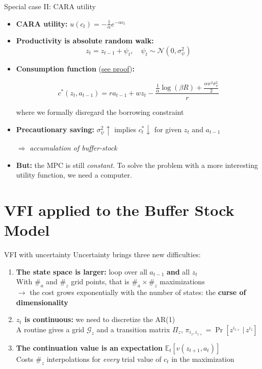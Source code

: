 \documentclass[
  10pt,
  ignorenonframetext,
  aspectratio=43,
  english,
]{beamer}
\providecommand{\tightlist}{%
  \setlength{\itemsep}{0pt}\setlength{\parskip}{0pt}}
\begin{document}
\begin{frame}{Special case II: CARA utility}
\protect{}\label{special-case-ii-cara-utility}
\begin{itemize}
\item
  \textbf{CARA utility:} \(u(c_{t})=-\frac{1}{\alpha}e^{-\alpha c_{t}}\)
\item
  \textbf{Productivity is absolute random walk:} \[
    z_{t}  =z_{t-1}+\psi_{t}, \quad \psi_{t}  \sim\mathcal{N}(0,\sigma^{2}_{\psi})
    \]
\item
  \textbf{Consumption function}
  (\href{https://www.econ2.jhu.edu/people/ccarroll/public/LectureNotes/Consumption/CARAModelWithYRisk/}{see
  proof})\textbf{:}

  \[
    c^{\ast}(z_{t},a_{t-1})=ra_{t-1}+wz_{t}-\frac{\frac{1}{\alpha}\log\left(\beta R\right)+\frac{\alpha w^{2}\sigma^{2}_{\psi}}{2}}{r}
    \]

  where we formally disregard the borrowing constraint
\item
  \textbf{Precautionary saving:} \(\sigma^{2}_{\psi}\uparrow\) implies
  \(c^{\ast}_{t}\downarrow\) for given \(z_{t}\) and \(a_{t-1}\)

  \(\Rightarrow\) \emph{accumulation of buffer-stock}
\item
  \textbf{But:} the MPC is still \emph{constant}. To solve the problem
  with a more interesting utility function, we need a computer.
\end{itemize}
\end{frame}

\section{VFI applied to the Buffer Stock
Model}\label{vfi-applied-to-the-buffer-stock-model}

\begin{frame}{VFI with uncertainty}
\protect{}\label{vfi-with-uncertainty}
Uncertainty brings three new difficulties:

\begin{enumerate}
\tightlist
\item
  \textbf{The state space is larger:} loop over all \(a_{t-1}\)
  \textbf{and} all \(z_t\) \pause\\
  With \(\#_{a}\) and \(\#_{z}\) grid points, that is
  \(\#_{a}\times \#_{z}\) maximizations\\
  \(\to\) the cost grows exponentially with the number of states: the
  \textbf{curse of dimensionality} \pause
\item
  \textbf{\(z_t\) is continuous:} we need to discretize the AR(1)
  \pause\\
  A routine gives a grid \(\mathcal{G}_{z}\) and a transition matrix
  \(\Pi_{z}\), \(\pi_{i_{z},i_{z+}}=\Pr[z^{i_{z+}}\,|\,z^{i_{z}}]\)
  \pause
\item
  \textbf{The continuation value is an expectation}
  \(\mathbb{E}_{t}\left[v(z_{t+1},a_{t})\right]\) \pause\\
  Costs \(\#_{z}\) interpolations for \emph{every} trial value of
  \(c_t\) in the maximization
\end{enumerate}
\end{frame}
\end{document}
